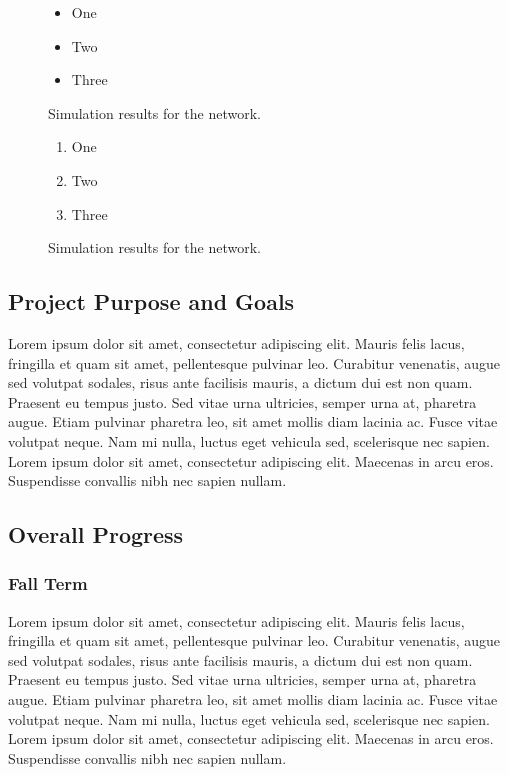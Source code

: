 \documentclass[draftclsnofoot,onecolumn]{IEEEtran}
\begin{document}
\begin{figure}[!t]
\centering
\begin{itemize}
    \item One
    \item Two
    \item Three
\end{itemize}
\caption{Simulation results for the network.}
\label{fig_sim3}
\end{figure}

\begin{figure}[!t]
\centering
\begin{enumerate}
    \item One
    \item Two
    \item Three
\end{enumerate}
\caption{Simulation results for the network.}
\label{fig_sim4}
\end{figure}


\subsection{Project Purpose and Goals}
Lorem ipsum dolor sit amet, consectetur adipiscing elit. Mauris felis lacus, fringilla et quam sit amet, pellentesque pulvinar leo. Curabitur venenatis, augue sed volutpat sodales, risus ante facilisis mauris, a dictum dui est non quam. Praesent eu tempus justo. Sed vitae urna ultricies, semper urna at, pharetra augue. Etiam pulvinar pharetra leo, sit amet mollis diam lacinia ac. Fusce vitae volutpat neque. Nam mi nulla, luctus eget vehicula sed, scelerisque nec sapien. Lorem ipsum dolor sit amet, consectetur adipiscing elit. Maecenas in arcu eros. Suspendisse convallis nibh nec sapien nullam.





\subsection{Overall Progress}

\subsubsection{Fall Term}
Lorem ipsum dolor sit amet, consectetur adipiscing elit. Mauris felis lacus, fringilla et quam sit amet, pellentesque pulvinar leo. Curabitur venenatis, augue sed volutpat sodales, risus ante facilisis mauris, a dictum dui est non quam. Praesent eu tempus justo. Sed vitae urna ultricies, semper urna at, pharetra augue. Etiam pulvinar pharetra leo, sit amet mollis diam lacinia ac. Fusce vitae volutpat neque. Nam mi nulla, luctus eget vehicula sed, scelerisque nec sapien. Lorem ipsum dolor sit amet, consectetur adipiscing elit. Maecenas in arcu eros. Suspendisse convallis nibh nec sapien nullam.
\end{document}
